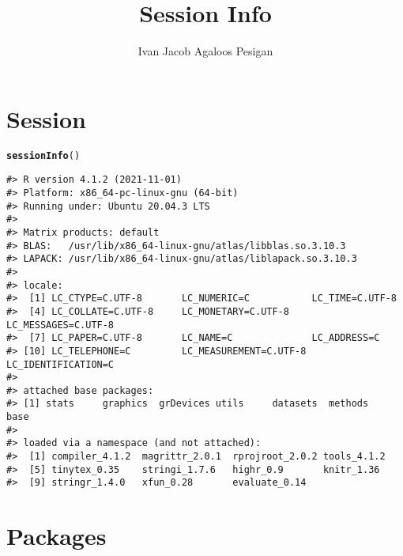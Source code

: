 \documentclass{article}\usepackage[]{graphicx}\usepackage{xcolor}
\title{Session Info}
\author{Ivan Jacob Agaloos Pesigan}
\date{}
\makeatletter
\newcommand{\hlstd}[1]{\textcolor[rgb]{0.345,0.345,0.345}{#1}}%
\newcommand{\hlkwd}[1]{\textcolor[rgb]{0.737,0.353,0.396}{\textbf{#1}}}%
\newenvironment{kframe}{%
 \def\at@end@of@kframe{}%
 \ifinner\ifhmode%
  \def\at@end@of@kframe{\end{minipage}}%
  \begin{minipage}{\columnwidth}%
 \fi\fi%
 \def\FrameCommand##1{\hskip\@totalleftmargin \hskip-\fboxsep
 \colorbox{shadecolor}{##1}\hskip-\fboxsep
     \hskip-\linewidth \hskip-\@totalleftmargin \hskip\columnwidth}%
 \MakeFramed {\advance\hsize-\width
   \@totalleftmargin\z@ \linewidth\hsize
   \@setminipage}}%
 {\par\unskip\endMakeFramed%
 \at@end@of@kframe}
\newenvironment{knitrout}{}{} %
\makeatother
\begin{document}
\maketitle







\section*{Session}

\begin{knitrout}
\color{fgcolor}\begin{kframe}
\begin{alltt}
\hlkwd{sessionInfo}\hlstd{()}
\end{alltt}
\begin{verbatim}
#> R version 4.1.2 (2021-11-01)
#> Platform: x86_64-pc-linux-gnu (64-bit)
#> Running under: Ubuntu 20.04.3 LTS
#> 
#> Matrix products: default
#> BLAS:   /usr/lib/x86_64-linux-gnu/atlas/libblas.so.3.10.3
#> LAPACK: /usr/lib/x86_64-linux-gnu/atlas/liblapack.so.3.10.3
#> 
#> locale:
#>  [1] LC_CTYPE=C.UTF-8       LC_NUMERIC=C           LC_TIME=C.UTF-8       
#>  [4] LC_COLLATE=C.UTF-8     LC_MONETARY=C.UTF-8    LC_MESSAGES=C.UTF-8   
#>  [7] LC_PAPER=C.UTF-8       LC_NAME=C              LC_ADDRESS=C          
#> [10] LC_TELEPHONE=C         LC_MEASUREMENT=C.UTF-8 LC_IDENTIFICATION=C   
#> 
#> attached base packages:
#> [1] stats     graphics  grDevices utils     datasets  methods   base     
#> 
#> loaded via a namespace (and not attached):
#>  [1] compiler_4.1.2  magrittr_2.0.1  rprojroot_2.0.2 tools_4.1.2    
#>  [5] tinytex_0.35    stringi_1.7.6   highr_0.9       knitr_1.36     
#>  [9] stringr_1.4.0   xfun_0.28       evaluate_0.14
\end{verbatim}
\end{kframe}
\end{knitrout}

\section*{Packages}
\end{document}
